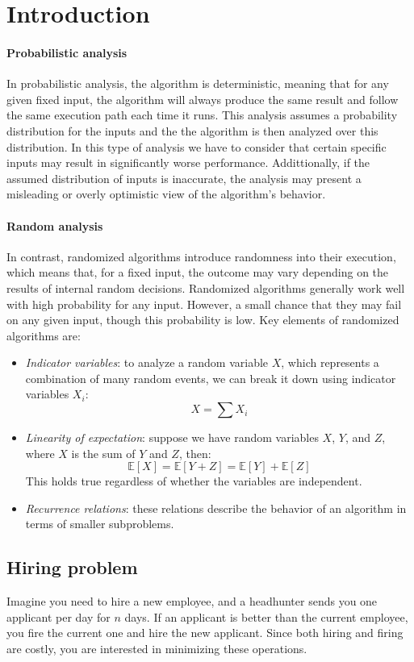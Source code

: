 \section{Introduction}

\paragraph*{Probabilistic analysis}
In probabilistic analysis, the algorithm is deterministic, meaning that for any given fixed input, the algorithm will always produce the same result and follow the same execution path each time it runs. 
This analysis assumes a probability distribution for the inputs and the the algorithm is then analyzed over this distribution. 
In this type of analysis we have to consider that certain specific inputs may result in significantly worse performance. 
Addittionally, if the assumed distribution of inputs is inaccurate, the analysis may present a misleading or overly optimistic view of the algorithm's behavior. 

\paragraph*{Random analysis}
In contrast, randomized algorithms introduce randomness into their execution, which means that, for a fixed input, the outcome may vary depending on the results of internal random decisions. 
Randomized algorithms generally work well with high probability for any input.
However, a small chance that they may fail on any given input, though this probability is low.
Key elements of randomized algorithms are: 
\begin{itemize}
    \item \textit{Indicator variables}: to analyze a random variable $X$, which represents a combination of many random events, we can break it down using indicator variables $X_i$:  
        \[X = \sum X_i\]
    \item \textit{Linearity of expectation}: suppose we have random variables $X$, $Y$, and $Z$, where $X$ is the sum of $Y$ and $Z$, then: 
        \[\mathbb{E}[X] = \mathbb{E}[Y + Z] = \mathbb{E}[Y] + \mathbb{E}[Z]\]
        This holds true regardless of whether the variables are independent.
    \item \textit{Recurrence relations}: these relations describe the behavior of an algorithm in terms of smaller subproblems.
\end{itemize}

\subsection{Hiring problem}
Imagine you need to hire a new employee, and a headhunter sends you one applicant per day for $n$ days. 
If an applicant is better than the current employee, you fire the current one and hire the new applicant. 
Since both hiring and firing are costly, you are interested in minimizing these operations.

